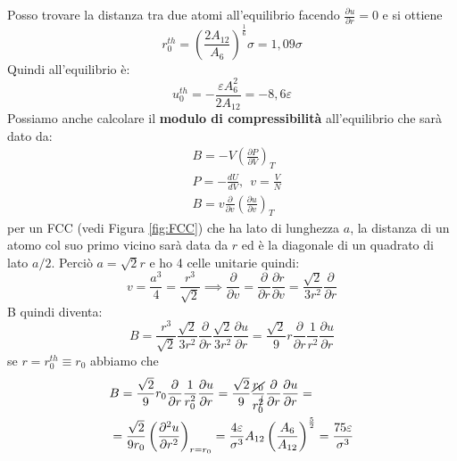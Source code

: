 Posso trovare la distanza tra due atomi all'equilibrio facendo $\frac{\partial u}{\partial r} = 0$ e si ottiene
\[ r_0^{th} = \left( \frac{2A_{12}}{A_6} \right)^{\frac{1}{6}}\sigma = 1,09\sigma\]
Quindi all'equilibrio è:
\[ u_0^{th} = -\frac{\varepsilon A_6^2}{2A_{12}} = -8,6\varepsilon\]
Possiamo anche calcolare il \textbf{modulo di compressibilità} all'equilibrio che sarà dato da:
\[ \begin{split}
    &B = - V \left( \frac{\partial P}{\partial V}\right)_T \\
    & P = -\frac{dU}{dV}, \ \ v = \frac{V}{N} \\
    & B = v \frac{\partial}{\partial v}\left( \frac{\partial u}{\partial v}\right)_T
\end{split} \]
per un FCC (vedi Figura \ref{fig:FCC}) che ha lato di lunghezza $a$, la distanza di un atomo col suo primo vicino sarà data da $r$ ed è la diagonale di un quadrato di lato $a/2$. Perciò $a = \sqrt{2}r$ e ho 4 celle unitarie quindi:
\[v = \frac{a^3}{4} = \frac{r^3}{\sqrt{2}} \implies \frac{\partial }{\partial v} = \frac{\partial}{\partial r}\frac{\partial r}{\partial v} = \frac{\sqrt{2}}{3r^2}\frac{\partial}{\partial r}\]
B quindi diventa:
\[ B = \frac{r^3}{\sqrt{2}} \frac{\sqrt{2}}{3r^2} \frac{\partial}{\partial r} \frac{\sqrt{2}}{3r^2}\frac{\partial u}{\partial r} = \frac{\sqrt{2}}{9} r \frac{\partial}{\partial r}\frac{1}{r^2}\frac{\partial u}{\partial r}\]
se $r = r_0^{th} \equiv r_0$ abbiamo che 
\[ \begin{split}
     &B = \frac{\sqrt{2}}{9} r_0 \frac{\partial}{\partial r}\frac{1}{r_0^2}\frac{\partial u}{\partial r} = \frac{\sqrt{2}}{9} \frac{\cancel{r_0}}{r_0^{\cancel{2}}}\frac{\partial}{\partial r}\frac{\partial u}{\partial r} =\\
     & = \frac{\sqrt{2}}{9r_0}\left(\frac{\partial^2 u}{\partial r^2}\right)_{r=r_0} = \frac{4\varepsilon}{\sigma^3} A_{12} \left( \frac{A_6}{A_{12}} \right)^{\frac{5}{2}} = \frac{75\varepsilon}{\sigma^3}
    \end{split}\]

